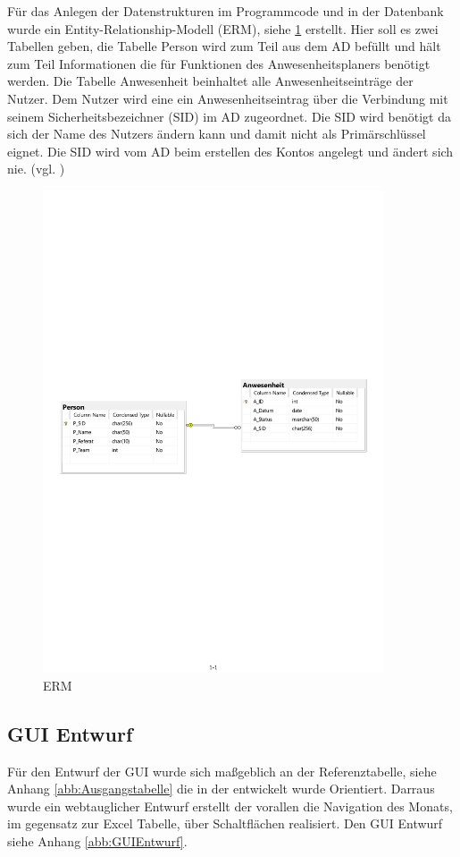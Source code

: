Für das Anlegen der Datenstrukturen im Programmcode und in der Datenbank wurde ein Entity-Relationship-Modell (ERM), siehe \ref{abb:ERM} erstellt. Hier soll es zwei Tabellen geben, die Tabelle Person wird zum Teil aus dem AD befüllt und hält zum Teil Informationen die für Funktionen des Anwesenheitsplaners benötigt werden. Die Tabelle Anwesenheit beinhaltet alle Anwesenheitseinträge der Nutzer. Dem Nutzer wird eine ein Anwesenheitseintrag über die Verbindung mit seinem Sicherheitsbezeichner (SID) im AD zugeordnet. Die SID wird benötigt da sich der Name des Nutzers ändern kann und damit nicht als Primärschlüssel eignet. Die SID wird vom AD beim erstellen des Kontos angelegt und ändert sich nie. (vgl. \cite{sid})

\begin{figure}[htbp]
    \centering
    \includegraphics[width=0.9\textwidth,angle=0]{abb/ERM.pdf}
    \caption[Beschreibung]{ERM}
    \label{abb:ERM}
\end{figure}

\subsection{GUI Entwurf}
\label{sec:GUI Entwurf}
Für den Entwurf der GUI wurde sich maßgeblich an der Referenztabelle, siehe Anhang \ref{abb:Ausgangstabelle} die in der  entwickelt wurde Orientiert. Darraus wurde ein webtauglicher Entwurf erstellt der vorallen die Navigation des Monats, im gegensatz zur Excel Tabelle, über Schaltflächen realisiert. Den GUI Entwurf siehe Anhang \ref{abb:GUIEntwurf}.


